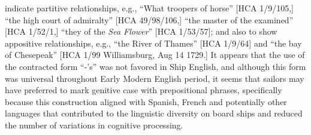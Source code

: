 \begin{styleStandard}
indicate partitive relationships, e.g., “What troopers of horse” [HCA 1/9/105,] “the high court of admiralty” [HCA 49/98/106,] “the master of the examined” [HCA 1/52/1,] “they of the \textit{Sea Flower}” [HCA 1/53/57]; and also to show appositive relationships, e.g., “the River of Thames” [HCA 1/9/64] and “the bay of Chesepeak” [HCA 1/99 Williamsburg, Aug 14 1729.] It appears that the use of the contracted form “-’s” was not favored in Ship English, and although this form was universal throughout Early Modern English period, it seems that sailors may have preferred to mark genitive case with prepositional phrases, specifically because this construction aligned with Spanish, French and potentially other languages that contributed to the linguistic diversity on board ships and reduced the number of variations in cognitive processing.
\end{styleStandard}

